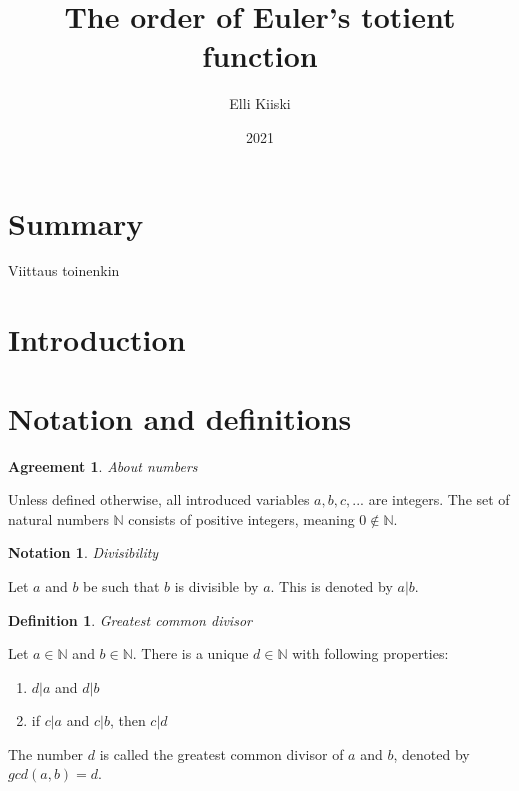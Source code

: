 \documentclass{article}
\title{The order of Euler's totient function}
\author{Elli Kiiski}
\date{2021}
\theoremstyle{definition}
\newtheorem{definition}[subsection]{Definition}
\newtheorem{notation}[subsection]{Notation}
\newtheorem{agreement}[subsection]{Agreement}
\begin{document}
\maketitle

\newpage

\section{Summary}

Viittaus \cite{HardyWright} toinenkin \cite{Saksman}

\section{Introduction}

\section{Notation and definitions}

\begin{agreement}{\emph{About numbers}}

Unless defined otherwise, all introduced variables $a, b, c, ...$ are integers. The set of natural numbers $\mathbb{N}$ consists of positive integers, meaning $0 \not\in \mathbb{N}$.

\end{agreement}

\begin{notation}{\emph{Divisibility}}

Let $a$ and $b$ be such that $b$ is divisible by $a$. This is denoted by $a \vert b$.

\end{notation}

\begin{definition}{\emph{Greatest common divisor}}

Let $a \in \mathbb{N}$ and $b \in \mathbb{N}$. There is a unique $d \in \mathbb{N}$ with following properties:

\begin{enumerate}
 \item $d \vert a$ and $d \vert b$
 \item if $c \vert a$ and $c \vert b$, then $c \vert d$
\end{enumerate}

The number $d$ is called the greatest common divisor of $a$ and $b$, denoted by $gcd(a,b) = d$.

\end{definition}
\end{document}
